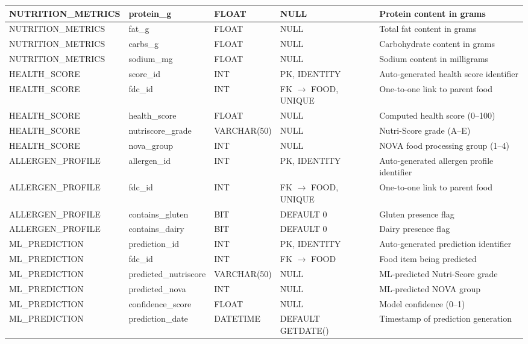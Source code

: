 \begin{table}[H]
\begin{tabularx}{\textwidth}{|l|l|l|l|X|}
NUTRITION\_METRICS & protein\_g & FLOAT & NULL & Protein content in grams \\ \hline
NUTRITION\_METRICS & fat\_g & FLOAT & NULL & Total fat content in grams \\ \hline
NUTRITION\_METRICS & carbs\_g & FLOAT & NULL & Carbohydrate content in grams \\ \hline
NUTRITION\_METRICS & sodium\_mg & FLOAT & NULL & Sodium content in milligrams \\ \hline
HEALTH\_SCORE & score\_id & INT & PK, IDENTITY & Auto-generated health score identifier \\ \hline
HEALTH\_SCORE & fdc\_id & INT & FK $\rightarrow$ FOOD, UNIQUE & One-to-one link to parent food \\ \hline
HEALTH\_SCORE & health\_score & FLOAT & NULL & Computed health score (0--100) \\ \hline
HEALTH\_SCORE & nutriscore\_grade & VARCHAR(50) & NULL & Nutri-Score grade (A--E) \\ \hline
HEALTH\_SCORE & nova\_group & INT & NULL & NOVA food processing group (1--4) \\ \hline
ALLERGEN\_PROFILE & allergen\_id & INT & PK, IDENTITY & Auto-generated allergen profile identifier \\ \hline
ALLERGEN\_PROFILE & fdc\_id & INT & FK $\rightarrow$ FOOD, UNIQUE & One-to-one link to parent food \\ \hline
ALLERGEN\_PROFILE & contains\_gluten & BIT & DEFAULT 0 & Gluten presence flag \\ \hline
ALLERGEN\_PROFILE & contains\_dairy & BIT & DEFAULT 0 & Dairy presence flag \\ \hline
ML\_PREDICTION & prediction\_id & INT & PK, IDENTITY & Auto-generated prediction identifier \\ \hline
ML\_PREDICTION & fdc\_id & INT & FK $\rightarrow$ FOOD & Food item being predicted \\ \hline
ML\_PREDICTION & predicted\_nutriscore & VARCHAR(50) & NULL & ML-predicted Nutri-Score grade \\ \hline
ML\_PREDICTION & predicted\_nova & INT & NULL & ML-predicted NOVA group \\ \hline
ML\_PREDICTION & confidence\_score & FLOAT & NULL & Model confidence (0--1) \\ \hline
ML\_PREDICTION & prediction\_date & DATETIME & DEFAULT GETDATE() & Timestamp of prediction generation \\ \hline
\end{tabularx}
\end{table}

